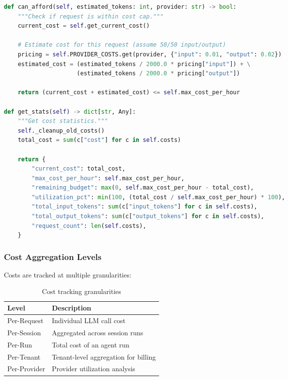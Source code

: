 \begin{lstlisting}[language=Python, caption={Budget enforcement}, label=lst:budget-enforcement]
def can_afford(self, estimated_tokens: int, provider: str) -> bool:
    """Check if request is within cost cap."""
    current_cost = self.get_current_cost()
    
    # Estimate cost for this request (assume 50/50 input/output)
    pricing = self.PROVIDER_COSTS.get(provider, {"input": 0.01, "output": 0.02})
    estimated_cost = (estimated_tokens / 2000.0 * pricing["input"]) + \
                     (estimated_tokens / 2000.0 * pricing["output"])
    
    return (current_cost + estimated_cost) <= self.max_cost_per_hour

def get_stats(self) -> dict[str, Any]:
    """Get cost statistics."""
    self._cleanup_old_costs()
    total_cost = sum(c["cost"] for c in self.costs)
    
    return {
        "current_cost": total_cost,
        "max_cost_per_hour": self.max_cost_per_hour,
        "remaining_budget": max(0, self.max_cost_per_hour - total_cost),
        "utilization_pct": min(100, (total_cost / self.max_cost_per_hour) * 100),
        "total_input_tokens": sum(c["input_tokens"] for c in self.costs),
        "total_output_tokens": sum(c["output_tokens"] for c in self.costs),
        "request_count": len(self.costs),
    }
\end{lstlisting}

\subsubsection{Cost Aggregation Levels}

Costs are tracked at multiple granularities:

\begin{table}[htbp]
\centering
\caption{Cost tracking granularities}
\label{tab:cost-granularities}
\begin{tabular}{ll}
\hline
\textbf{Level} & \textbf{Description} \\
\hline
Per-Request & Individual LLM call cost \\
Per-Session & Aggregated across session runs \\
Per-Run & Total cost of an agent run \\
Per-Tenant & Tenant-level aggregation for billing \\
Per-Provider & Provider utilization analysis \\
\hline
\end{tabular}
\end{table}

